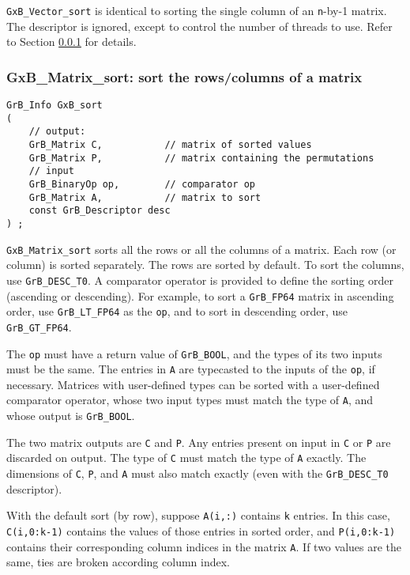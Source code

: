 \documentclass[12pt]{article}
\begin{document}
{\verb'GxB_Vector_sort' is identical to sorting the single column of an
\verb'n'-by-1 matrix.  The descriptor is ignored, except to control the number
of threads to use.  Refer to Section \ref{matrix_sort} for details.

\subsubsection{{\sf GxB\_Matrix\_sort:} sort the rows/columns of a matrix}
\label{matrix_sort}

\begin{mdframed}[userdefinedwidth=6in]
{\footnotesize
\begin{verbatim}
GrB_Info GxB_sort
(
    // output:
    GrB_Matrix C,           // matrix of sorted values
    GrB_Matrix P,           // matrix containing the permutations
    // input
    GrB_BinaryOp op,        // comparator op
    GrB_Matrix A,           // matrix to sort
    const GrB_Descriptor desc
) ;
\end{verbatim}
} \end{mdframed}

\verb'GxB_Matrix_sort' sorts all the rows or all the columns of a matrix.
Each row (or column) is sorted separately.  The rows are sorted by default.
To sort the columns, use \verb'GrB_DESC_T0'.  A comparator operator is
provided to define the sorting order (ascending or descending).
For example, to sort a \verb'GrB_FP64' matrix in ascending order,
use \verb'GrB_LT_FP64' as the \verb'op', and to sort in descending order,
use \verb'GrB_GT_FP64'.

The \verb'op' must have a return value of \verb'GrB_BOOL', and the types of
its two inputs must be the same.  The entries in \verb'A' are typecasted to
the inputs of the \verb'op', if necessary.  Matrices with user-defined types
can be sorted with a user-defined comparator operator, whose two input types
must match the type of \verb'A', and whose output is \verb'GrB_BOOL'.

The two matrix outputs are \verb'C' and \verb'P'.  Any entries present on input
in \verb'C' or \verb'P' are discarded on output.  The type of \verb'C' must
match the type of \verb'A' exactly.  The dimensions of \verb'C', \verb'P', and
\verb'A' must also match exactly (even with the \verb'GrB_DESC_T0'
descriptor).

With the default sort (by row), suppose \verb'A(i,:)' contains \verb'k'
entries.  In this case, \verb'C(i,0:k-1)' contains the values of those entries
in sorted order, and \verb'P(i,0:k-1)' contains their corresponding column
indices in the matrix \verb'A'.  If two values are the same, ties are broken
according column index.

}
\end{document}
